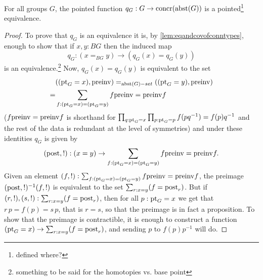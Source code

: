 \begin{lemma}
  \label{lem:Groupsareidentitytypes}%
For all groups $G$, the pointed function $q_G:G\to\mathrm{concr}(\mathrm{abst}(G))$ 
is a pointed\footnote{defined where?} equivalence.
\end{lemma}
\begin{proof}
  To prove that $q_G$ is an equivalence it is, by \cref{lem:eqandcovofconntypes}, enough to show that if $x,y:BG$ then the induced map
$$q_G:(x=_{BG}y)\to (q_G(x)=q_G(y))%
$$
is an equivalence.\footnote{something to be said for the homotopies vs. base point}  Now, $q_G(x)=q_G(y)$ is equivalent to the set 
\begin{align*}
  &(({\mathord{\mathrm{pt}}}_G=x),\mathrm{preinv})=_{\mathrm{abst}(G)-set}(({\mathord{\mathrm{pt}}}_G=y),\mathrm{preinv})\\
=&\sum_{f:({\mathord{\mathrm{pt}}}_G=x)=({\mathord{\mathrm{pt}}}_G=y)}f\mathrm{preinv}=\mathrm{preinv} f
\end{align*}
 ($f\mathrm{preinv}=\mathrm{preinv} f$ is shorthand for $\prod_{q:{\mathord{\mathrm{pt}}}_G=x}\prod_{p:{\mathord{\mathrm{pt}}}_G=p}f(pq^{-1})=f(p)q^{-1}$ and the rest of the data is redundant at the level of symmetries) and under these identities $q_G$ is given by 
$$(\mathrm{post},!):(x=y)\to \sum_{f:({\mathord{\mathrm{pt}}}_G=x)=({\mathord{\mathrm{pt}}}_G=y)}f\mathrm{preinv}=\mathrm{preinv} f.$$
Given an element
$(f,!):\sum_{f:({\mathord{\mathrm{pt}}}_G=x)=({\mathord{\mathrm{pt}}}_G=y)}f\mathrm{preinv}=\mathrm{preinv} f$, the preimage 
$(\mathrm{post},!)^{-1}(f,!)$ is equivalent to the set
$\sum_{r:x=y}(f=\mathrm{post}_r)$.  But if $(r,!),(s,!): \sum_{r:x=y}(f=\mathrm{post}_r)$, then for all $p:{\mathord{\mathrm{pt}}}_G=x$ we get that $r\,p=f(p)=s\,p$, that is $r=s$, so that the preimage is in fact a proposition.  
To show that the preimage is contractible, it is enough to construct a function $({\mathord{\mathrm{pt}}}_G=x)\to \sum_{r:x=y}(f=\mathrm{post}_r)$, and sending $p$ to $f(p)p^{-1}$ will do.
\end{proof}


